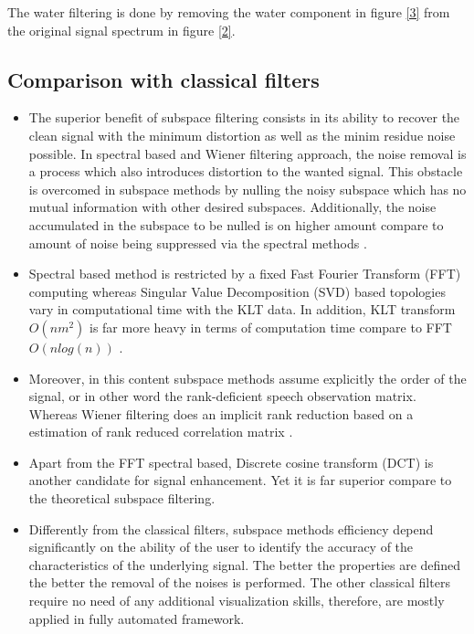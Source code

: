 The water filtering is done by removing the water component in figure \ref{3} from the original signal spectrum in figure \ref{2}. 

\subsection{Comparison with classical filters}

\begin{itemize}


\item The superior benefit of subspace filtering consists in its ability to recover the clean signal with the minimum distortion as well as the minim residue noise possible. In spectral based and Wiener filtering approach, the noise removal is a process which also introduces distortion to the wanted signal. This obstacle is overcomed in subspace methods by nulling the noisy subspace which has no mutual information with other desired subspaces. Additionally, the noise accumulated in the subspace to be nulled is on higher amount compare to amount of noise being suppressed via the spectral methods \cite{3}. 

\item Spectral based method is restricted by a fixed Fast Fourier Transform (FFT) computing whereas Singular Value Decomposition (SVD) based topologies vary in computational time with the KLT data. In addition, KLT transform $O(nm^2)$ is far more heavy in terms of computation time compare to FFT $O(nlog(n))$ \cite{2}.

\item Moreover, in this content subspace methods assume explicitly the order of the signal, or in other word the rank-deficient speech observation matrix. Whereas Wiener filtering does an implicit rank reduction based on a estimation of rank reduced correlation matrix \cite{2}.

\item Apart from the FFT spectral based, Discrete cosine transform (DCT) is another candidate for signal enhancement. Yet it is far superior compare to the theoretical subspace filtering\cite{2}.

\item Differently from the classical filters, subspace methods efficiency depend significantly on the ability of the user to identify the accuracy of the characteristics of the underlying signal. The better the properties are defined the better the removal of the noises is performed\cite{5}. The other classical filters require no need of any additional visualization skills, therefore, are mostly applied in fully automated framework.


\end{itemize}
